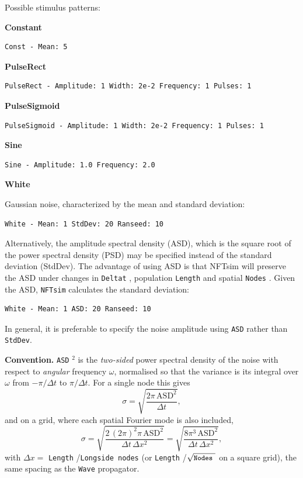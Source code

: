 \documentclass[12pt,a4paper]{article}
\newcommand{\type}[1]{{\small\small\tt #1} }
\newcommand{\NF}[0]{\type{NFTsim}}
\begin{document}
\begin{description}
\begin{itemize}
    Possible stimulus patterns:

    \vspace{5mm}
    \textbf{Constant}
    \begin{lstlisting}
Const - Mean: 5
    \end{lstlisting}

    \vspace{5mm}
    \textbf{PulseRect}
    \begin{lstlisting}
PulseRect - Amplitude: 1 Width: 2e-2 Frequency: 1 Pulses: 1
    \end{lstlisting}

    \vspace{5mm}
    \textbf{PulseSigmoid}
    \begin{lstlisting}
PulseSigmoid - Amplitude: 1 Width: 2e-2 Frequency: 1 Pulses: 1
    \end{lstlisting}

    \vspace{5mm}
    \textbf{Sine}
    \begin{lstlisting}
Sine - Amplitude: 1.0 Frequency: 2.0
    \end{lstlisting}

    \vspace{5mm}
    \textbf{White}

    Gaussian noise, characterized by the mean and standard deviation:
    \begin{lstlisting}
White - Mean: 1 StdDev: 20 Ranseed: 10
    \end{lstlisting}

    Alternatively, the amplitude spectral density (ASD), which is the square root of the power spectral density (PSD) may be specified instead of the standard deviation (StdDev). The advantage of using ASD is that NFTsim will preserve the ASD under changes in \type{Deltat}, population \type{Length} and spatial \type{Nodes}. Given the ASD, \NF  calculates the standard deviation:
    \begin{lstlisting}
White - Mean: 1 ASD: 20 Ranseed: 10
    \end{lstlisting}

    In general, it is preferable to specify the noise amplitude using \texttt{ASD} rather than \texttt{StdDev}.

    \textbf{Convention.}
    \type{ASD}\(^2\) is the \emph{two-sided} power spectral density of the noise with respect to \emph{angular} frequency \(\omega\), normalised so that the variance is its integral over \(\omega\) from \(-\pi/\Delta t\) to \(\pi/\Delta t\).
    For a single node this gives
    \[
        \sigma = \sqrt{\frac{2\pi\,\mathrm{ASD}^2}{\Delta t}},
    \]
    and on a grid, where each spatial Fourier mode is also included,
    \[
        \sigma = \sqrt{\frac{2\,(2\pi)^2\pi\,\mathrm{ASD}^2}{\Delta t\,\Delta x^2}}
               = \sqrt{\frac{8\pi^3\,\mathrm{ASD}^2}{\Delta t\,\Delta x^2}},
    \]
    with \(\Delta x = \) \type{Length}/\type{Longside nodes} (or \type{Length}/\(\sqrt{\text{\type{Nodes}}}\) on a square grid), the same spacing as the \type{Wave} propagator.


\end{itemize}
\end{description}
\end{document}
